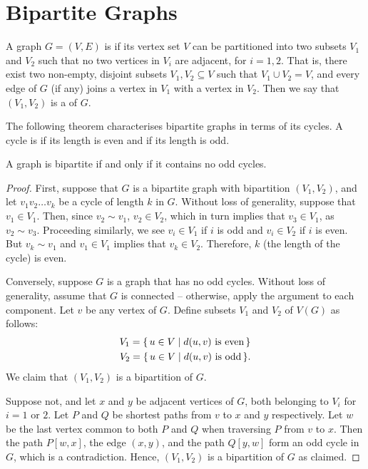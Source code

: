\section{Bipartite Graphs}\label{sec:Bipartite}

A graph $G = (V, E)$ is  if its vertex set $V$ can be partitioned into two subsets $V_1$ and $V_2$ such that no two vertices in $V_i$ are adjacent, for $i = 1, 2$. That is, there exist two non-empty, disjoint subsets $V_1, V_2 \subseteq V$ such that $V_1 \cup V_2 = V$, and every edge of $G$ (if any) joins a vertex in $V_1$ with a vertex in $V_2$. Then we say that $(V_1, V_2)$ is a  of $G$.

The following theorem characterises bipartite graphs in terms of its cycles. A cycle is  if its length is even and  if its length is odd.

\begin{Theorem}
A graph is bipartite if and only if it contains no odd cycles.
\end{Theorem}

\begin{proof}
First, suppose that $G$ is a bipartite graph with bipartition $(V_1, V_2)$, and let $v_1 v_2 \ldots v_k$ be a cycle of length $k$ in $G$. Without loss of generality, suppose that $v_1 \in V_1$. Then, since $v_2 \sim v_1$, $v_2 \in V_2$, which in turn implies that $v_3 \in V_1$, as $v_2 \sim v_3$. Proceeding similarly, we see $v_i \in V_1$ if $i$ is odd and $v_i \in V_2$ if $i$ is even. But $v_k \sim v_1$ and $v_1 \in V_1$ implies that $v_k \in V_2$. Therefore, $k$ (the length of the cycle) is even.

Conversely, suppose $G$ is a graph that has no odd cycles. Without loss of generality, assume that $G$ is connected -- otherwise, apply the argument to each component. Let $v$ be any vertex of $G$. Define subsets $V_1$ and $V_2$ of $V(G)$ as follows:
\begin{align*}
    V_1 = \qty{\, u \in V \mid d(u, v)\ \text{is even} \,} \\
    V_2 = \qty{\, u \in V \mid d(u, v)\ \text{is odd} \,}.
\end{align*}
We claim that $(V_1, V_2)$ is a bipartition of $G$.

Suppose not, and let $x$ and $y$ be adjacent vertices of $G$, both belonging to $V_i$ for $i = 1$ or $2$. Let $P$ and $Q$ be shortest paths from $v$ to $x$ and $y$ respectively. Let $w$ be the last vertex common to both $P$ and $Q$ when traversing $P$ from $v$ to $x$. Then the path $P[w,x]$, the edge $(x, y)$, and the path $Q[y,w]$ form an odd cycle in $G$, which is a contradiction. Hence, $(V_1, V_2)$ is a bipartition of $G$ as claimed.
\end{proof}

